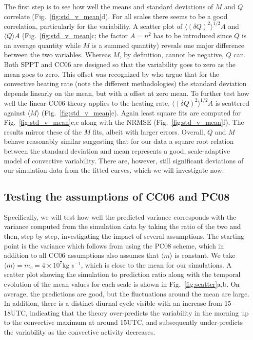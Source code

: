 \documentclass[a4paper, 12pt]{article}
\begin{document}
The first step is to see how well the means and standard deviations of $M$ and $Q$ correlate (Fig.~\ref{fig:std_v_mean}d). For all scales there seems to be a good correlation, particularly for the variability. A scatter plot of $\langle (\delta Q )^2 \rangle^{1/2} A$ and $\langle Q \rangle A$ (Fig.~\ref{fig:std_v_mean}c; the factor $A=n^2$ has to be introduced since $Q$ is an average quantity while $M$ is a summed quantity) reveals one major difference between the two variables. Whereas $M$, by definition, cannot be negative, $Q$ can. Both SPPT and CC06 are designed so that the variability goes to zero as the mean goes to zero. This offset was recognized by \cite{Shutts2007} who argue that for the convective heating rate (note the different methodologies) the standard deviation depends linearly on the mean, but with a offset at zero mean. To further test how well the linear CC06 theory applies to the heating rate, $\langle (\delta Q )^2 \rangle^{1/2} A$ is scattered against $\langle M \rangle$ (Fig.~\ref{fig:std_v_mean}e). Again least square fits are computed for Fig.~\ref{fig:std_v_mean}c,e along with the NRMSE (Fig.~\ref{fig:std_v_mean}f). The results mirror these of the $M$ fits, albeit with larger errors. Overall, $Q$ and $M$ behave reasonably similar suggesting that for our data a square root relation between the standard deviation and mean represents a good, scale-adaptive model of convective variability. There are, however, still significant deviations of our simulation data from the fitted curves, which we will investigate now. 

\subsection{Testing the assumptions of CC06 and PC08}
Specifically, we will test how well the predicted variance corresponds with the variance computed from the simulation data by taking the ratio of the two and then, step by step, investigating the impact of several assumptions. The starting point is the variance which follows from using the PC08 scheme, which in addition to all CC06 assumptions also assumes that $\langle m \rangle$ is constant. We take $\langle m \rangle = m_c = 4\times10^7$kg s$^{-1}$, which is close to the mean for our simulations. A scatter plot showing the simulation to prediction ratio along with the temporal evolution of the mean values for each scale is shown in Fig.~\ref{fig:scatter}a,b. On average, the predictions are good, but the fluctuations around the mean are large. In addition, there is a distinct diurnal cycle visible with an increase from 15--18UTC, indicating that the theory over-predicts the variability in the morning up to the convective maximum at around 15UTC, and subsequently under-predicts the variability as the convective activity decreases. 
\end{document}

